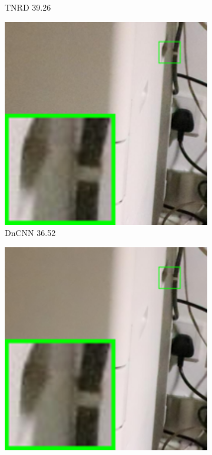 \begin{figure}
\begin{subfigure}[t]{0.19\textwidth}
\caption{TNRD 39.26}
    \end{subfigure}
\hfill
    \begin{subfigure}[t]{0.19\textwidth}
        \centering
        \includegraphics[width=1\textwidth]{images/guided/resize_br_DnCNN_Canon_80D_ISO12800_IMG_2321_part2.png}
		\caption{DnCNN 36.52}
    \end{subfigure}
    \hfill
    \begin{subfigure}[t]{0.19\textwidth}
        \centering
        \includegraphics[width=1\textwidth]{images/guided/resize_br_NI_Canon_80D_ISO12800_IMG_2321_part2.png}

\end{subfigure}
\end{figure}

